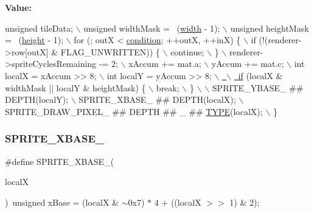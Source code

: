{\bfseries Value\+:}
\begin{DoxyCode}
\textcolor{keywordtype}{unsigned} tileData; \(\backslash\)
    unsigned widthMask = ~(\mbox{\hyperlink{gregbook_2readpng_8c_ad02cd220028343ea4b1943ff4aedc38d}{width}} - 1); \(\backslash\)
    unsigned heightMask = ~(\mbox{\hyperlink{gregbook_2readpng_8c_ad35d10a175726c3e46ffb65e8d6e4703}{height}} - 1); \(\backslash\)
    for (; outX < \mbox{\hyperlink{isa-lr35902_8c_a9cc5e499f71726f3a653debd7bf9ccc7}{condition}}; ++outX, ++inX) \{ \(\backslash\)
        if (!(renderer->row[outX] & FLAG\_UNWRITTEN)) \{ \(\backslash\)
            continue; \(\backslash\)
        \} \(\backslash\)
        renderer->spriteCyclesRemaining -= 2; \(\backslash\)
        xAccum += mat.a; \(\backslash\)
        yAccum += mat.c; \(\backslash\)
        int localX = xAccum >> 8; \(\backslash\)
        int localY = yAccum >> 8; \mbox{\hyperlink{isa-arm_8c_a0736bf8f9c6b829a423d7d7a43b781e8}{\(\backslash\)}}
\mbox{\hyperlink{isa-arm_8c_a0736bf8f9c6b829a423d7d7a43b781e8}{        \(\backslash\)}}
\mbox{\hyperlink{isa-arm_8c_a0736bf8f9c6b829a423d7d7a43b781e8}{        if}} (localX & widthMask || localY & heightMask) \{ \(\backslash\)
            break; \(\backslash\)
        \} \(\backslash\)
        \(\backslash\)
        SPRITE\_YBASE\_ ## DEPTH(localY); \(\backslash\)
        SPRITE\_XBASE\_ ## DEPTH(localX); \(\backslash\)
        SPRITE\_DRAW\_PIXEL\_ ## DEPTH ## \_ ## \mbox{\hyperlink{inflate9_8h_a164ea0159d5f0b5f12a646f25f99eceaab47ea8bb955afd0adc0ef98517dd6084}{TYPE}}(localX); \(\backslash\)
    \}
\end{DoxyCode}
\mbox{\label{software-obj_8c_a3d841add7f051a581ae5adc380199c1e}} 
\subsubsection{\texorpdfstring{S\+P\+R\+I\+T\+E\+\_\+\+X\+B\+A\+S\+E\+\_}{SPRITE\_XBASE\_16}}
{\footnotesize\ttfamily \#define S\+P\+R\+I\+T\+E\+\_\+\+X\+B\+A\+S\+E\+\_(\begin{DoxyParamCaption}\item[{}]{localX }\end{DoxyParamCaption})~unsigned x\+Base = (localX \& $\sim$0x7) $\ast$ 4 + ((local\+X $>$$>$ 1) \& 2);}

